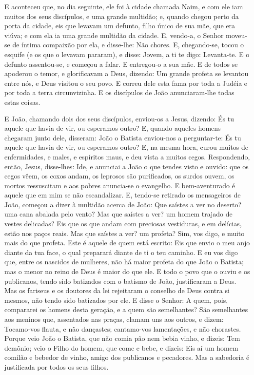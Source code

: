 E aconteceu que, no dia seguinte, ele foi à cidade chamada Naim,
e com ele iam muitos dos seus discípulos, e uma grande multidão;
e, quando chegou perto da porta da cidade, eis que levavam um
defunto, filho único de sua mãe, que era viúva; e com ela ia uma
grande multidão da cidade. E, vendo-a, o Senhor moveu-se de
íntima compaixão por ela, e disse-lhe: Não chores. E,
chegando-se, tocou o esquife (e os que o levavam pararam), e disse:
Jovem, a ti te digo: Levanta-te. E o defunto assentou-se, e começou
a falar. E entregou-o a sua mãe. E de todos se
apoderou o temor, e glorificavam a Deus, dizendo: Um grande profeta
se levantou entre nós, e Deus visitou o seu povo. E correu
dele esta fama por toda a Judéia e por toda a terra circunvizinha.
E os discípulos de João anunciaram-lhe todas estas coisas.

E João, chamando dois dos seus discípulos, enviou-os a Jesus,
dizendo: És tu aquele que havia de vir, ou esperamos outro?
E, quando aqueles homens chegaram junto dele, disseram: João
o Batista enviou-nos a perguntar-te: És tu aquele que havia de vir,
ou esperamos outro? E, na mesma hora, curou muitos de
enfermidades, e males, e espíritos maus, e deu vista a muitos cegos.
Respondendo, então, Jesus, disse-lhes: Ide, e anunciai a João
o que tendes visto e ouvido: que os cegos vêem, os coxos andam, os
leprosos são purificados, os surdos ouvem, os mortos ressuscitam e
aos pobres anuncia-se o evangelho. E bem-aventurado é aquele
que em mim se não escandalizar. E, tendo-se retirado os
mensageiros de João, começou a dizer à multidão acerca de João: Que
saístes a ver no deserto? uma cana abalada pelo vento? Mas
que saístes a ver? um homem trajado de vestes delicadas? Eis que os
que andam com preciosas vestiduras, e em delícias, estão nos paços
reais. Mas que saístes a ver? um profeta? Sim, vos digo, e
muito mais do que profeta. Este é aquele de quem está
escrito: Eis que envio o meu anjo diante da tua face, o qual
preparará diante de ti o teu caminho. E eu vos digo que,
entre os nascidos de mulheres, não há maior profeta do que João o
Batista; mas o menor no reino de Deus é maior do que ele. E
todo o povo que o ouviu e os publicanos, tendo sido batizados com o
batismo de João, justificaram a Deus. Mas os fariseus e os
doutores da lei rejeitaram o conselho de Deus contra si mesmos, não
tendo sido batizados por ele. E disse o Senhor: A quem, pois,
compararei os homens desta geração, e a quem são semelhantes?
São semelhantes aos meninos que, assentados nas praças,
clamam uns aos outros, e dizem: Tocamo-vos flauta, e não dançastes;
cantamo-vos lamentações, e não chorastes. Porque veio João o
Batista, que não comia pão nem bebia vinho, e dizeis: Tem demônio;
veio o Filho do homem, que come e bebe, e dizeis: Eis aí um
homem comilão e bebedor de vinho, amigo dos publicanos e pecadores.
Mas a sabedoria é justificada por todos os seus filhos.

